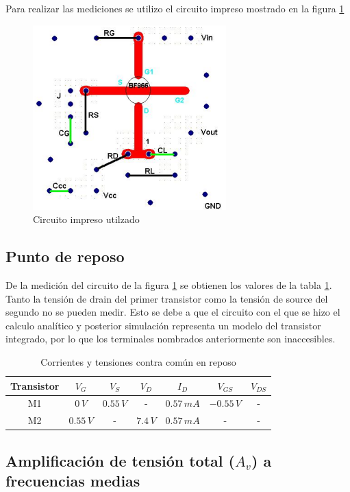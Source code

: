 \documentclass[10pt,spanish,a4paper,notitlepage]{article}
\begin{document}
Para realizar las mediciones se utilizo el circuito impreso mostrado en la figura \ref{fig:impreso}

\begin{figure}[H]
\centering
\includegraphics[scale=0.8]{circuitos/Impreso.png}
\caption{Circuito impreso utilzado}
\label{fig:impreso}
\end{figure}

\subsection{Punto de reposo}

De la medición del circuito de la figura \ref{fig:impreso} se obtienen los valores de la tabla \ref{table:valoresreposomedidos}. Tanto la tensión de drain del primer transistor como la tensión de source del segundo no se pueden medir. Esto se debe a que el circuito con el que se hizo el calculo analítico y posterior simulación representa un modelo del transistor integrado, por lo que los terminales nombrados anteriormente son inaccesibles.

\begin{table}[H]
\centering
\begin{tabular}{|c|c|c|c|c|c|c|} 
\hline
Transistor & $V_{G}$ & $V_{S}$ & $V_{D}$ & $I_{D}$ & $V_{GS}$ & $V_{DS}$  \\ \hline
M1 & $0\,\unit{V}$ & $0.55\,\unit{V}$  & - & $0.57\,\unit{mA}$ & $-0.55\,\unit{V}$  & - \\ \hline
M2 & $0.55\,\unit{V}$ & - & $7.4\,\unit{V}$ & $0.57\,\unit{mA}$ & - & -\\ \hline
\end{tabular}
\caption{Corrientes y tensiones contra común en reposo}
\label{table:valoresreposomedidos}
\end{table}

\subsection{Amplificación de tensión total (\texorpdfstring{$A_v$}{TEXT}) a frecuencias medias}
\end{document}
